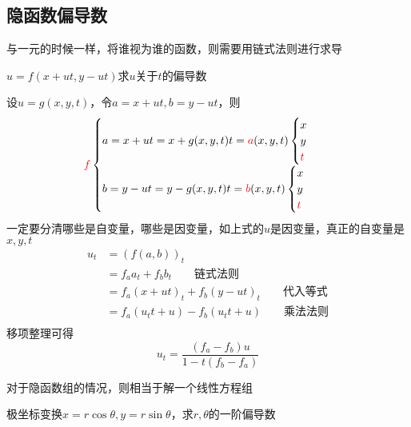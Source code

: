 \subsection{隐函数偏导数}
与一元的时候一样，将谁视为谁的函数，则需要用链式法则进行求导
\begin{example}
$u=f(x+ut,y-ut)$求$u$关于$t$的偏导数
\end{example}
\begin{analysis}
设$u=g(x,y,t)$，令$a=x+ut,b=y-ut$，则
\[\textcolor{red}{f}\begin{cases}a=x+ut=x+g(x,y,t)t=\textcolor{red}{a}(x,y,t)\begin{cases}x\\y\\\textcolor{red}{t}\end{cases}\\b=y-ut=y-g(x,y,t)t=\textcolor{red}{b}(x,y,t)\begin{cases}x\\y\\\textcolor{red}{t}\end{cases}\end{cases}\]
一定要分清哪些是自变量，哪些是因变量，如上式的$u$是因变量，真正的自变量是$x,y,t$
\[\begin{aligned}
u_t&=(f(a,b))_t\\
&=f_a a_t+f_b b_t\qquad\mbox{链式法则}\\
&=f_a (x+ut)_t + f_b (y-ut)_t\qquad\mbox{代入等式}\\
&=f_a (u_t t+u)- f_b (u_t t+u)\qquad\mbox{乘法法则}\\
\end{aligned}\]
移项整理可得
\[u_t=\dfrac{(f_a-f_b)u}{1-t(f_b-f_a)}\]
\end{analysis}
对于隐函数组的情况，则相当于解一个线性方程组
\begin{example}
极坐标变换$x=r\cos\theta,y=r\sin\theta$，求$r,\theta$的一阶偏导数
\end{example}
